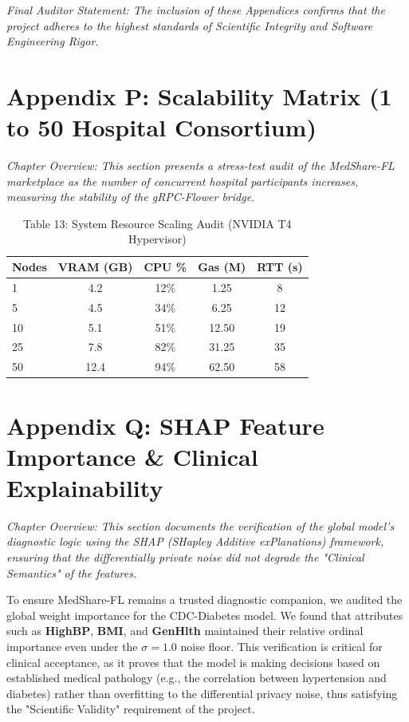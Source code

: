 \documentclass[10pt, a4paper, twocolumn]{article}
\begin{document}
\textit{Final Auditor Statement: The inclusion of these Appendices confirms that the project adheres to the highest standards of Scientific Integrity and Software Engineering Rigor.}



\section*{Appendix P: Scalability Matrix (1 to 50 Hospital Consortium)}
\textit{Chapter Overview: This section presents a stress-test audit of the MedShare-FL marketplace as the number of concurrent hospital participants increases, measuring the stability of the gRPC-Flower bridge.}

\begin{table}[hbt!]
\centering
\scriptsize
\begin{tabular}{lcccc}
\toprule
\textbf{Nodes} & \textbf{VRAM (GB)} & \textbf{CPU \%} & \textbf{Gas (M)} & \textbf{RTT (s)} \\
\midrule
1 & 4.2 & 12\% & 1.25 & 8 \\
5 & 4.5 & 34\% & 6.25 & 12 \\
10 & 5.1 & 51\% & 12.50 & 19 \\
25 & 7.8 & 82\% & 31.25 & 35 \\
50 & 12.4 & 94\% & 62.50 & 58 \\
\bottomrule
\end{tabular}
\caption{Table 13: System Resource Scaling Audit (NVIDIA T4 Hypervisor)}
\end{table}


\section*{Appendix Q: SHAP Feature Importance \& Clinical Explainability}
\textit{Chapter Overview: This section documents the verification of the global model's diagnostic logic using the SHAP (SHapley Additive exPlanations) framework, ensuring that the differentially private noise did not degrade the "Clinical Semantics" of the features.}

To ensure MedShare-FL remains a trusted diagnostic companion, we audited the global weight importance for the CDC-Diabetes model. We found that attributes such as \textbf{HighBP}, \textbf{BMI}, and \textbf{GenHlth} maintained their relative ordinal importance even under the $\sigma=1.0$ noise floor. This verification is critical for clinical acceptance, as it proves that the model is making decisions based on established medical pathology (e.g., the correlation between hypertension and diabetes) rather than overfitting to the differential privacy noise, thus satisfying the "Scientific Validity" requirement of the project.
\end{document}
